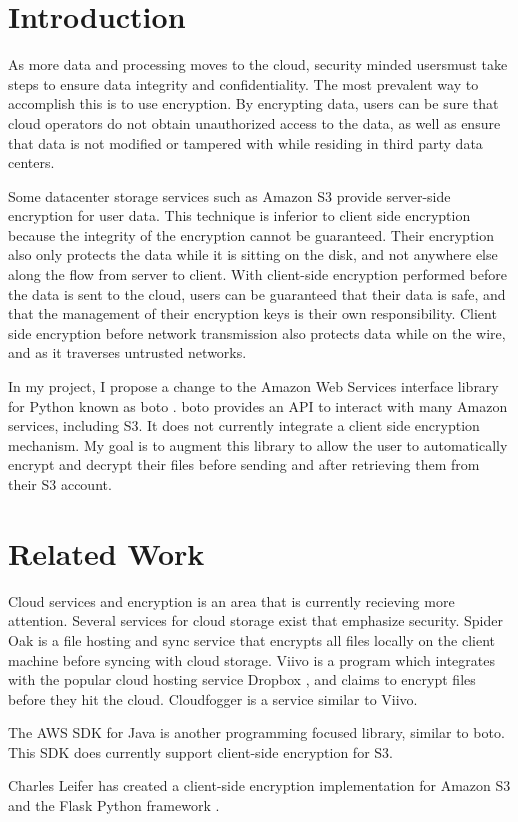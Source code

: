 \section{Introduction}
As more data and processing moves to the cloud, security minded usersmust take steps to ensure data integrity and confidentiality.
The most prevalent way to accomplish this is to use encryption. 
By encrypting data, users can be sure that cloud operators do not
obtain unauthorized access to the data, as well as ensure that data is not modified or tampered with while residing in third party data centers.

Some datacenter storage services such as Amazon S3 \cite{amazons3} provide server-side encryption for user data. This technique is inferior to client side encryption because the integrity of the encryption cannot be guaranteed.
Their encryption also only protects the data while it is sitting on the disk, and not anywhere else along the flow from server to client.
With client-side encryption performed before the data is sent to the cloud, users can be guaranteed that their data is safe, and that the management of their encryption keys is their own responsibility. 
Client side encryption before network transmission also protects data while on the wire, and as it traverses untrusted networks.

In my project, I propose a change to the Amazon Web Services interface library for Python known as boto \cite{boto}. boto provides an API to interact with many Amazon services, including S3. It does not currently integrate a client side encryption mechanism. My goal is to augment this library to allow the user to automatically encrypt and decrypt their files before sending and after retrieving them from their S3 account.

\section{Related Work}
Cloud services and encryption is an area that is currently recieving more attention. Several services for cloud storage exist that emphasize security. Spider Oak \cite{spideroak} is a file hosting and sync service that encrypts all files locally on the client machine before syncing with cloud storage. Viivo \cite{viivo} is a program which integrates with the popular cloud hosting service Dropbox \cite{dropbox}, and claims to encrypt files before they hit the cloud. Cloudfogger \cite{cloudfogger} is a service similar to Viivo.

The AWS SDK for Java \cite{aws-sdk-java} is another programming focused library, similar to boto. This SDK does currently support client-side encryption for S3.

Charles Leifer  has created a client-side encryption implementation for Amazon S3 and the Flask Python framework \cite{flask}.
